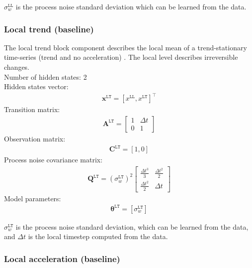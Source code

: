 \noindent
$\sigma_{w}^{\mathtt{LL}}$ is the process noise standard deviation which can be learned from the data.

\subsubsection{Local trend (baseline)}

The local trend block component describes the local mean of a trend-stationary time-series (trend and no acceleration) \cite{STC:STC2035}. 
The local level describes irreversible changes.\\

\noindent
Number of hidden states: 2\\

Hidden states vector: 
\begin{gather*}
 \mathbf{x}^{\mathtt{LT}} = [x^{\mathtt{LL}}, x^{\mathtt{LT}}]^{\intercal}
 \end{gather*}
Transition matrix: 
\begin{gather*}
\mathbf{A}^{\mathtt{LT}}= \left[\begin{array}{cc}1 &\Delta t\\0&1\end{array}\right]
\end{gather*}
Observation matrix: 
\begin{gather*}
\mathbf{C}^{\mathtt{LT}}=[1, 0]
\end{gather*}
Process noise covariance matrix: 
\begin{gather*}
\mathbf{Q}^{\mathtt{LT}}= (\sigma_{w}^{\mathtt{LT}})^{2}\left[\begin{array}{cc}\tfrac{\Delta t^{3}}{3} &\tfrac{\Delta t^{2}}{2}\\\tfrac{\Delta t^{2}}{2}&\Delta t\end{array}\right]
\end{gather*}
Model parameters: 
\begin{gather*}
\bm\theta^{\mathtt{LT}}=[\sigma_{w}^{\mathtt{LT}} ]
\end{gather*}

\noindent
$\sigma_{w}^{\mathtt{LT}}$ is the process noise standard deviation, which can be learned from the data, and $\Delta t$ is the local timestep computed from the data.


\subsubsection{Local acceleration (baseline)}

